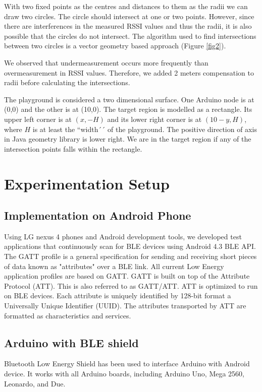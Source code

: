 \documentclass[conference,a4paper]{../../sty/IEEEtran}
\begin{document}
With two fixed points as the centres and distances to them as the radii we can draw two circles.
The circle should intersect at one or two points.
However, since there are interferences in the measured RSSI values and thus the radii, it is also possible that the circles do not intersect.
The algorithm used to find intersections between two circles is a vector geometry based approach (Figure \ref{fig2})\cite{cshint}.

We observed that undermeasurement occurs more frequently than overmeasurement in RSSI values.
Therefore, we added 2 meters compensation to radii before calculating the intersections.

The playground is considered a two dimensional surface.
One Arduino node is at (0,0) and the other is at (10,0).
The target region is modelled as a rectangle.
Its upper left corner is at $(x, -H)$ and its lower right corner is at $(10-y, H)$, where $H$ is at least the ``width´´ of the playground.
The positive direction of axis in Java geometry library is lower right.
We are in the target region if any of the intersection points falls within the rectangle.

\section{Experimentation Setup}

\subsection{Implementation on Android Phone}

Using LG nexus 4 phones and Android development tools, we developed test applications that continuously scan for BLE devices using Android 4.3 BLE API. The GATT profile is a general specification for sending and receiving short pieces of data known as "attributes" over a BLE link. All current Low Energy application profiles are based on GATT. GATT is built on top of the Attribute Protocol (ATT). This is also referred to as GATT/ATT. ATT is optimized to run on BLE devices. Each attribute is uniquely identified by 128-bit format a Universally Unique Identifier (UUID). The attributes transported by ATT are formatted as characteristics and services.

\subsection{Arduino with BLE shield}

Bluetooth Low Energy Shield has been used to interface Arduino with Android device. It works with all Arduino boards, including Arduino Uno, Mega 2560, Leonardo, and Due. 
\end{document}
